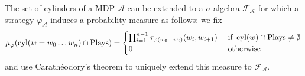 The set of cylinders of a \ac{MDP} $\mathcal{A}$ can be extended to a
$\sigma$-algebra $\mathcal{F}_{\mathcal{A}}$ for which a strategy
$\varphi_{\mathcal{A}}$ induces a probability measure as follows: we fix
\begin{equation}
  \mu_{\varphi}(\operatorname{cyl}(w = w_{0}\dots w_{n})\cap\operatorname{Plays}) = \begin{cases}
    \prod_{i=1}^{n-1}\tau_{\varphi(w_{0}\dots w_{i})}(w_{i}, w_{i+1}) &\text{ if }\operatorname{cyl}(w)\cap\operatorname{Plays}\neq\emptyset\\
    0 &\text{ otherwise}
  \end{cases}
\end{equation}
and use Carath\'eodory's theorem to uniquely extend this measure to
$\mathcal{F}_{\mathcal{A}}$.

